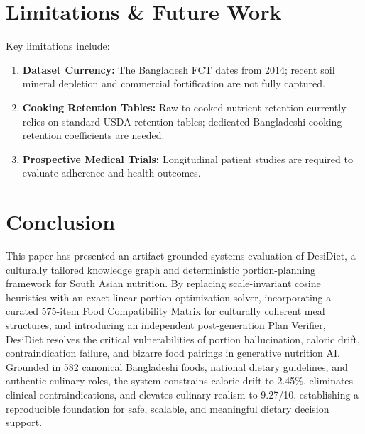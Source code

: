 \documentclass[5p,times,twocolumn]{elsarticle}
\makeatletter
\def\systemname{DesiDiet}%
\def\my@bx{bx}
\def\my@b{b}
\DeclareRobustCommand{\systemname}{%
  \texorpdfstring{%
    \ifx\f@series\my@bx
      DesiDiet%
    \else\ifx\f@series\my@b
      DesiDiet%
    \else
      \textsc{DesiDiet}%
    \fi\fi
  }{DesiDiet}%
}
\makeatother
\begin{document}
\section{Limitations \& Future Work}
\label{sec:limitations}

Key limitations include:
\begin{enumerate}[leftmargin=*,itemsep=1.5pt]
  \item \textbf{Dataset Currency:} The Bangladesh FCT dates from 2014; recent soil mineral depletion and commercial fortification are not fully captured.
  \item \textbf{Cooking Retention Tables:} Raw-to-cooked nutrient retention currently relies on standard USDA retention tables; dedicated Bangladeshi cooking retention coefficients are needed.
  \item \textbf{Prospective Medical Trials:} Longitudinal patient studies are required to evaluate adherence and health outcomes.
\end{enumerate}

\section{Conclusion}
\label{sec:conclusion}

This paper has presented an artifact-grounded systems evaluation of \systemname{}, a culturally tailored knowledge graph and deterministic portion-planning framework for South Asian nutrition. By replacing scale-invariant cosine heuristics with an exact linear portion optimization solver, incorporating a curated 575-item Food Compatibility Matrix for culturally coherent meal structures, and introducing an independent post-generation Plan Verifier, \systemname{} resolves the critical vulnerabilities of portion hallucination, caloric drift, contraindication failure, and bizarre food pairings in generative nutrition AI. Grounded in 582 canonical Bangladeshi foods, national dietary guidelines, and authentic culinary roles, the system constrains caloric drift to 2.45\%, eliminates clinical contraindications, and elevates culinary realism to 9.27/10, establishing a reproducible foundation for safe, scalable, and meaningful dietary decision support.
\end{document}
